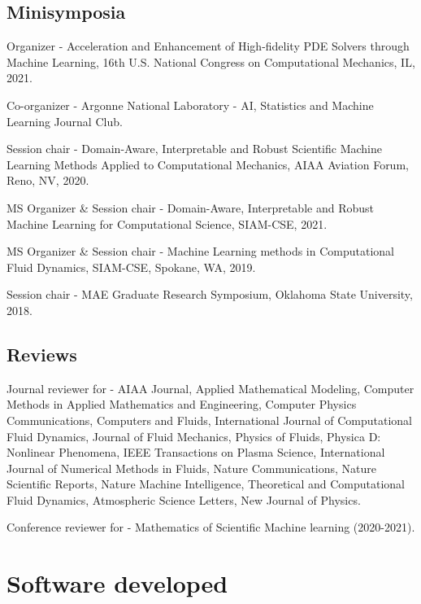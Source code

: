 \documentclass[letterpaper]{article}
\renewenvironment{itemize}{
  \begin{list}{}{
    \setlength{\leftmargin}{1.5em}
  }
}{
  \end{list}
}
\begin{document}
\subsection*{Minisymposia}

\begin{itemize}
  \item Organizer - Acceleration and Enhancement of High-fidelity PDE Solvers through Machine Learning, 16th U.S. National Congress on Computational Mechanics, IL, 2021.
  \item Co-organizer - Argonne National Laboratory - AI, Statistics and Machine Learning Journal Club.
  \item Session chair - Domain-Aware, Interpretable and Robust Scientific Machine Learning Methods Applied to Computational Mechanics, AIAA Aviation Forum, Reno, NV, 2020.
  \item MS Organizer \& Session chair - Domain-Aware, Interpretable and Robust Machine Learning for Computational Science, SIAM-CSE, 2021.
  \item MS Organizer \& Session chair - Machine Learning methods in Computational Fluid Dynamics, SIAM-CSE, Spokane, WA, 2019.
  \item Session chair - MAE Graduate Research Symposium, Oklahoma State University, 2018.
\end{itemize}

\subsection*{Reviews}

\begin{itemize}
  \item Journal reviewer for - AIAA Journal, Applied Mathematical Modeling, Computer Methods in Applied Mathematics and Engineering, Computer Physics Communications, Computers and Fluids, International Journal of Computational Fluid Dynamics, Journal of Fluid Mechanics, Physics of Fluids, Physica D: Nonlinear Phenomena, IEEE Transactions on Plasma Science, International Journal of Numerical Methods in Fluids, Nature Communications, Nature Scientific Reports, Nature Machine Intelligence, Theoretical and Computational Fluid Dynamics, Atmospheric Science Letters, New Journal of Physics.
  \item Conference reviewer for - Mathematics of Scientific Machine learning (2020-2021).
  
\end{itemize}

\section*{Software developed}
\end{document}
